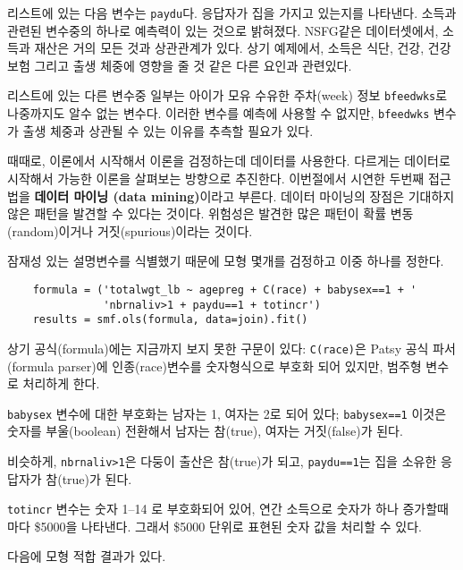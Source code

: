 리스트에 있는 다음 변수는 {\tt paydu}다.
응답자가 집을 가지고 있는지를 나타낸다.
소득과 관련된 변수중의 하나로 예측력이 있는 것으로 밝혀졌다.
NSFG같은 데이터셋에서, 소득과 재산은 거의 모든 것과 상관관계가 있다. 
상기 예제에서, 소득은 식단, 건강, 건강보험 그리고 출생 체중에 영향을 줄 것 같은 다른 요인과 관련있다.

리스트에 있는 다른 변수중 일부는 아이가 모유 수유한 주차(week) 정보 {\tt bfeedwks}로 나중까지도 알수 없는 변수다.
이러한 변수를 예측에 사용할 수 없지만, {\tt bfeedwks} 변수가 출생 체중과 상관될 수 있는 이유를 추측할 필요가 있다.

때때로, 이론에서 시작해서 이론을 검정하는데 데이터를 사용한다. 
다르게는 데이터로 시작해서 가능한 이론을 살펴보는 방향으로 추진한다.
이번절에서 시연한 두번째 접근법을 {\bf 데이터 마이닝 (data mining)}이라고 부른다. 데이터 마이닝의 장점은 기대하지 않은 패턴을 발견할 수 있다는 것이다. 위험성은 발견한 많은 패턴이 확률 변동(random)이거나 거짓(spurious)이라는 것이다. 

잠재성 있는 설명변수를 식별했기 때문에 모형 몇개를 검정하고 이중 하나를 정한다.

\begin{verbatim}
    formula = ('totalwgt_lb ~ agepreg + C(race) + babysex==1 + '
               'nbrnaliv>1 + paydu==1 + totincr')
    results = smf.ols(formula, data=join).fit()
\end{verbatim}

상기 공식(formula)에는 지금까지 보지 못한 구문이 있다:
{\tt C(race)}은 Patsy 공식 파서 (formula parser)에 인종(race)변수를 숫자형식으로 부호화 되어 있지만, 범주형 변수로 처리하게 한다.

{\tt babysex} 변수에 대한 부호화는 남자는 1, 여자는 2로 되어 있다; 
{\tt babysex==1} 이것은 숫자를 부울(boolean) 전환해서 남자는 참(true), 여자는 거짓(false)가 된다.

비슷하게, {\tt nbrnaliv>1}은 다둥이 출산은 참(true)가 되고,
{\tt paydu==1}는 집을 소유한 응답자가 참(true)가 된다.

{\tt totincr} 변수는 숫자 1--14 로 부호화되어 있어, 연간 소득으로 숫자가 하나 증가할때 마다 \$5000을 나타낸다. 그래서 \$5000 단위로 표현된 숫자 값을 처리할 수 있다.

다음에 모형 적합 결과가 있다.

